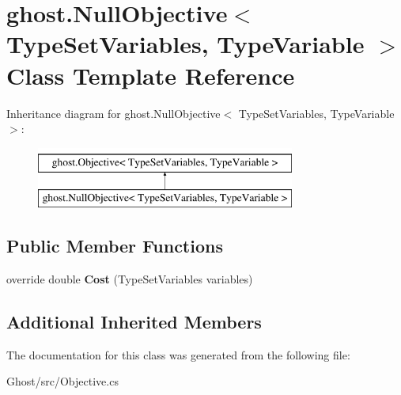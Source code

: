 \hypertarget{classghost_1_1NullObjective_3_01TypeSetVariables_00_01TypeVariable_01_4}{\section{ghost.\-Null\-Objective$<$ Type\-Set\-Variables, Type\-Variable $>$ Class Template Reference}
\label{classghost_1_1NullObjective_3_01TypeSetVariables_00_01TypeVariable_01_4}
}
Inheritance diagram for ghost.\-Null\-Objective$<$ Type\-Set\-Variables, Type\-Variable $>$\-:\begin{figure}[H]
\begin{center}
\leavevmode
\includegraphics[height=2.000000cm]{classghost_1_1NullObjective_3_01TypeSetVariables_00_01TypeVariable_01_4}
\end{center}
\end{figure}
\subsection*{Public Member Functions}
\begin{DoxyCompactItemize}
\item 
\hypertarget{classghost_1_1NullObjective_3_01TypeSetVariables_00_01TypeVariable_01_4_a644e5a014d52e576153c362d3c9de538}{override double {\bfseries Cost} (Type\-Set\-Variables variables)}\label{classghost_1_1NullObjective_3_01TypeSetVariables_00_01TypeVariable_01_4_a644e5a014d52e576153c362d3c9de538}

\end{DoxyCompactItemize}
\subsection*{Additional Inherited Members}


The documentation for this class was generated from the following file\-:\begin{DoxyCompactItemize}
\item 
Ghost/src/Objective.\-cs\end{DoxyCompactItemize}

